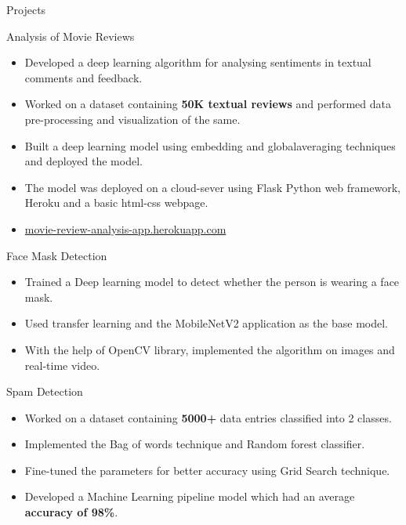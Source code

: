 \documentclass{article}
\newlength{\tabin}
\newlength{\secsep}
\newcommand{\lineunder}{\vspace*{-8pt} \\ \hspace*{-6pt} \hrulefill \\ \vspace*{-15pt}}
\newenvironment{tabbedsection}[1]{
  \begin{list}{}{
      \setlength{\itemsep}{0pt}
      \setlength{\labelsep}{0pt}
      \setlength{\labelwidth}{0pt}
      \setlength{\leftmargin}{\tabin}
      \setlength{\rightmargin}{\tabin}
      \setlength{\listparindent}{0pt}
      \setlength{\parsep}{0pt}
      \setlength{\parskip}{0pt}
      \setlength{\partopsep}{0pt}
      \setlength{\topsep}{#1}
    }
  \item[]
}{\end{list}}
\newenvironment{resume_section}[1]{
  \filbreak
  \vspace{2\secsep}
  \textsc{\large#1}
  \lineunder
  \begin{tabbedsection}{\secsep}
}{\end{tabbedsection}}
\newenvironment{resume_subsection}[2][]{
  \textbf{#2} \hfill {\footnotesize #1} \hspace{2em}
  \begin{tabbedsection}{0.5\secsep}
}{\end{tabbedsection}}
\newenvironment{subitems}{
  \renewcommand{\labelitemi}{-}
  \begin{itemize}
      \setlength{\labelsep}{1em}
}{\end{itemize}}
\begin{document}
\begin{resume_section}{Projects}
  \begin{resume_subsection}[(May 2020)]{Analysis of Movie Reviews}
  \begin{subitems}
    \item Developed a deep learning algorithm for analysing sentiments in textual comments and feedback.
    \item Worked on a dataset containing \textbf{50K textual reviews} and performed data pre-processing and visualization of the same.
    \item Built a deep learning model using embedding and globalaveraging techniques and deployed the model.
    \item The model was deployed on a cloud-sever using Flask Python web framework, Heroku and a basic html-css webpage.
    \item \href{https://movie-review-analysis-app.herokuapp.com/}{movie-review-analysis-app.herokuapp.com}
    \end{subitems}
  \end{resume_subsection}
  
\begin{resume_subsection}[(May 2020)]{Face Mask Detection}
    \begin{subitems}
        \item Trained a Deep learning model to detect whether the person is wearing a face mask. 
        \item Used transfer learning and the MobileNetV2 application as the base model.
        \item With the help of OpenCV library, implemented the algorithm on images and real-time video.
    \end{subitems}
  \end{resume_subsection}

\begin{resume_subsection}[(April 2020)]{Spam Detection}
    \begin{subitems}
        \item Worked on a dataset containing \textbf{5000+} data entries classified into 2 classes.
        \item Implemented the Bag of words technique and Random forest classifier. 
        \item Fine-tuned the parameters for better accuracy using Grid Search technique.
        \item Developed a Machine Learning pipeline model which had an average \textbf{accuracy of 98\%}.
    \end{subitems}
  \end{resume_subsection}


\end{resume_section}
\end{document}
